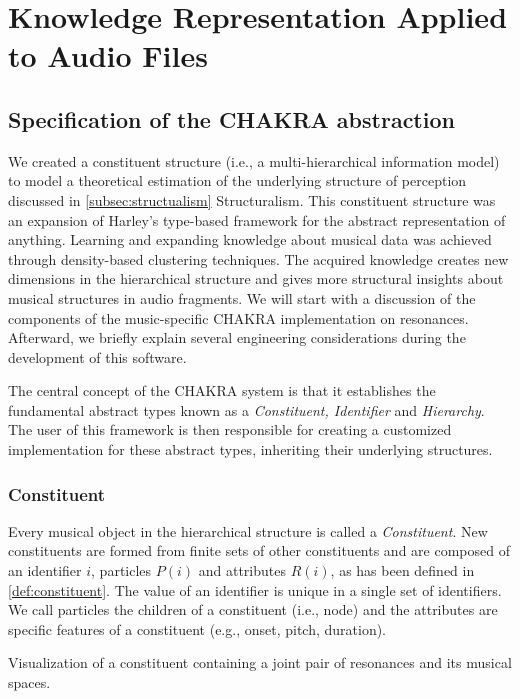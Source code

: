 \chapter{Knowledge Representation Applied to Audio Files}
\label{chap:architecture}

\section{Specification of the CHAKRA abstraction}
We created a constituent structure (i.e., a multi-hierarchical information model) to model a theoretical estimation of the underlying structure of perception discussed in \ref{subsec:structualism} Structuralism. This constituent structure was an expansion of Harley's type-based framework for the abstract representation of anything. Learning and expanding knowledge about musical data was achieved through density-based clustering techniques. The acquired knowledge creates new dimensions in the hierarchical structure and gives more structural insights about musical structures in audio fragments. We will start with a discussion of the components of the music-specific CHAKRA implementation on resonances. Afterward, we briefly explain several engineering considerations during the development of this software. 


The central concept of the CHAKRA system is that it establishes the fundamental abstract types known as a \textit{Constituent, Identifier} and \textit{Hierarchy}. The user of this framework is then responsible for creating a customized implementation for these abstract types, inheriting their underlying structures.


\subsection{Constituent}
Every musical object in the hierarchical structure is called a \textit{Constituent}. New constituents are formed from finite sets of other constituents and are composed of an identifier $i$, particles $P(i)$ and attributes $R(i)$, as has been defined in \ref{def:constituent}. The value of an identifier is unique in a single set of identifiers. We call particles the children of a constituent (i.e., node) and the attributes are specific features of a constituent (e.g., onset, pitch, duration).


\begin{marginfigure}
\vspace{3cm}
\centering

\vspace{0.1cm}
\caption{Visualization of a constituent containing a joint pair of resonances and its musical spaces.}
\label{constituentRes} 
\vspace{1cm}
\end{marginfigure}


